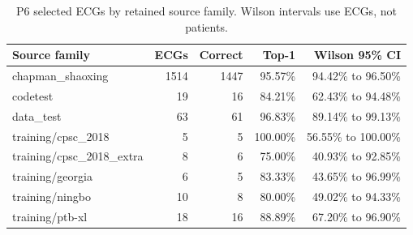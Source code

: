 \begin{table}[tbp]
\caption{P6 selected ECGs by retained source family. Wilson intervals use ECGs, not patients.\label{tab:app_source_primary6}}
\centering\small
\begin{tabular}{lrrrr}
\toprule
Source family & ECGs & Correct & Top-1 & Wilson 95\% CI \\
\midrule
chapman\_shaoxing & 1514 & 1447 & 95.57\% & 94.42\% to 96.50\% \\
codetest & 19 & 16 & 84.21\% & 62.43\% to 94.48\% \\
data\_test & 63 & 61 & 96.83\% & 89.14\% to 99.13\% \\
training/cpsc\_2018 & 5 & 5 & 100.00\% & 56.55\% to 100.00\% \\
training/cpsc\_2018\_extra & 8 & 6 & 75.00\% & 40.93\% to 92.85\% \\
training/georgia & 6 & 5 & 83.33\% & 43.65\% to 96.99\% \\
training/ningbo & 10 & 8 & 80.00\% & 49.02\% to 94.33\% \\
training/ptb-xl & 18 & 16 & 88.89\% & 67.20\% to 96.90\% \\
\bottomrule
\end{tabular}
\end{table}